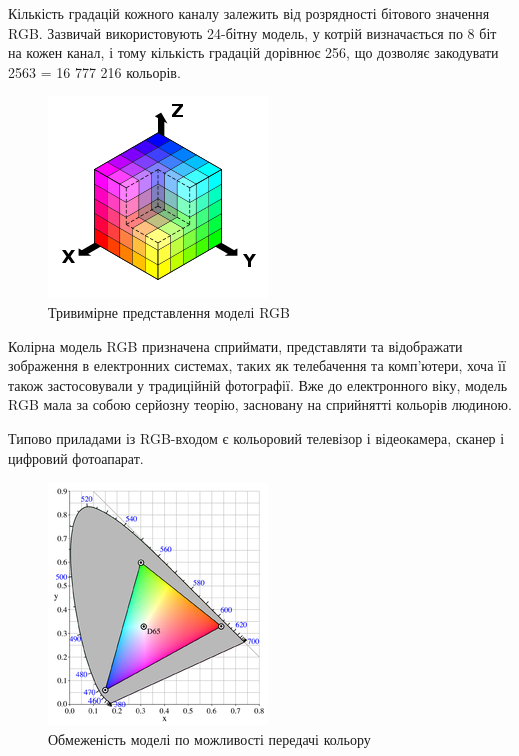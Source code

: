 Кількість градацій кожного каналу залежить від розрядності бітового значення RGB. Зазвичай використовують 24-бітну модель, у котрій визначається по 8 біт на кожен канал, і тому кількість градацій дорівнює 256, що дозволяє закодувати 2563 = 16 777 216  кольорів.

\begin{figure}[H]
	\centering
	\includegraphics[width=0.7\linewidth]{theory/img/rgb_representation}
	\caption{Тривимірне представлення моделі RGB}
	\label{fig:rgb_representation}
\end{figure}

Колірна модель RGB призначена сприймати, представляти та відображати зображення в електронних системах, таких як телебачення та комп'ютери, хоча її також застосовували у традиційній фотографії. Вже до електронного віку, модель RGB мала за собою серйозну теорію, засновану на сприйнятті кольорів людиною.

Типово приладами із RGB-входом є кольоровий телевізор і відеокамера, сканер і цифровий фотоапарат.

\begin{figure}[H]
	\centering
	\includegraphics[width=0.7\linewidth]{theory/img/rgb_limitations}
	\caption{Обмеженість моделі по можливості передачі кольору}
	\label{fig:rgb_limitations}
\end{figure}

